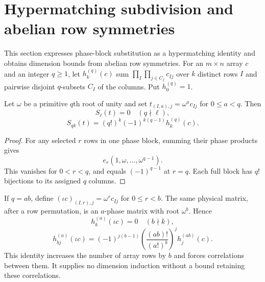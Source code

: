 \section{Hypermatching subdivision and abelian row symmetries}
This section expresses phase-block substitution as a hypermatching identity and obtains dimension bounds from abelian row symmetries.
For an $m\times n$ array $c$ and an integer $q\geq1$, let
$h_k^{(q)}(c)$ sum $\prod_I\prod_{j\in C_I}c_{Ij}$ over $k$
distinct rows $I$ and pairwise disjoint $q$-subsets $C_I$ of the
columns. Put $h_0^{(q)}=1$.
\begin{proposition}
Let $\omega$ be a primitive $q$th root of unity and set
$t_{(I,a),j}=\omega^ac_{Ij}$ for $0\leq a<q$.
Then
\[
 S_\ell(t)=0\quad(q\nmid\ell),
\]\[
 S_{qk}(t)=(q!)^k(-1)^{k(q-1)}h_k^{(q)}(c).
\]
\end{proposition}
\begin{proof}
For any selected $r$ rows in one phase block, summing their phase
products gives
\[e_r(1,\omega,\ldots,\omega^{q-1}).\]
This vanishes
for $0<r<q$, and equals $(-1)^{q-1}$ at $r=q$. Each full block
has $q!$ bijections to its assigned $q$ columns.
\end{proof}
If $q=ab$, define $(\iota c)_{(I,r),j}=\omega^rc_{Ij}$ for
$0\leq r<b$. The same physical matrix, after a row permutation,
is an $a$-phase matrix with root $\omega^b$. Hence
\[
 h_k^{(a)}(\iota c)=0\quad(b\nmid k),
\]\[
 h_{bj}^{(a)}(\iota c)
 =(-1)^{j(b-1)}
 \left(\frac{(ab)!}{(a!)^b}\right)^j h_j^{(ab)}(c).
\]
This identity increases the number of array rows by $b$ and forces
correlations between them. It supplies no dimension induction
without a bound retaining these correlations.


